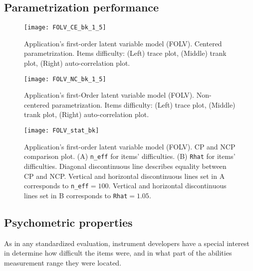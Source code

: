 \subsection{Parametrization performance}

%
\begin{figure}[H]
	\centering
	\texttt{[image: FOLV\_CE\_bk\_1\_5]}
	\caption[Application's first-order latent variable model (FOLV). Centered parametrization. Items difficulty. Trace, trank and auto-correlation plots.]%
	{Application's first-order latent variable model (FOLV). Centered parametrization. Items difficulty: (Left) trace plot, (Middle) trank plot, (Right) auto-correlation plot.}
	\label{fig:FOLV_CE_chains1}
\end{figure}
%
\begin{figure}[H]
	\centering
	\texttt{[image: FOLV\_NC\_bk\_1\_5]}
	\caption[Application's first-order latent variable model (FOLV). Non-centered parametrization. Items difficulty. Trace, trank and auto-correlation plots.]%
	{Application's first-Order latent variable model (FOLV). Non-centered parametrization. Items difficulty: (Left) trace plot, (Middle) trank plot, (Right) auto-correlation plot.}
	\label{fig:FOLV_NC_chains1}
\end{figure}
%
\begin{figure}[H]
	\centering
	\texttt{[image: FOLV\_stat\_bk]}
	\caption[Application's first-order latent variable model (FOLV). CP and NCP comparison plot.]%
	{Application's first-order latent variable model (FOLV). CP and NCP comparison plot. (A) \texttt{n\_eff} for items' difficulties. (B) \texttt{Rhat} for items' difficulties. Diagonal discontinuous line describes equality between CP and NCP. Vertical and horizontal discontinuous lines set in A corresponds to \texttt{n\_eff}$=100$. Vertical and horizontal discontinuous lines set in B corresponds to \texttt{Rhat}$=1.05$. }
	\label{fig:FOLV_stat1}
\end{figure}



\subsection{Psychometric properties}

As in any standardized evaluation, instrument developers have a special interest in determine how difficult the items were, and in what part of the abilities measurement range they were located.

